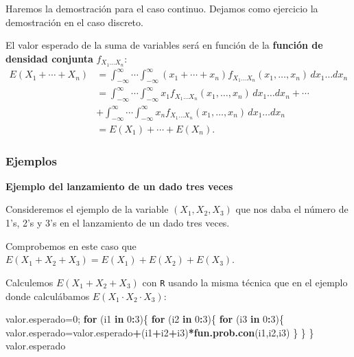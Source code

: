 \documentclass[]{book}
\newenvironment{Shaded}{\begin{snugshade}}{\end{snugshade}}
\newcommand{\ControlFlowTok}[1]{\textcolor[rgb]{0.13,0.29,0.53}{\textbf{#1}}}
\newcommand{\DecValTok}[1]{\textcolor[rgb]{0.00,0.00,0.81}{#1}}
\newcommand{\KeywordTok}[1]{\textcolor[rgb]{0.13,0.29,0.53}{\textbf{#1}}}
\newcommand{\NormalTok}[1]{#1}
\newcommand{\OperatorTok}[1]{\textcolor[rgb]{0.81,0.36,0.00}{\textbf{#1}}}
\begin{document}
Haremos la demostración para el caso continuo. Dejamos como ejercicio la demostración en el caso discreto.

El valor esperado de la suma de variables será en función de la \textbf{función de densidad conjunta} \(f_{X_1\ldots X_n}\):
\[
\begin{array}{rl}
E(X_1+\cdots + X_n) & = \int_{-\infty}^\infty\cdots\int_{-\infty}^\infty (x_1+\cdots + x_n)f_{X_1\ldots X_n}(x_1,\ldots,x_n)\,dx_1\ldots dx_n \\ & = \int_{-\infty}^\infty\cdots\int_{-\infty}^\infty x_1f_{X_1\ldots X_n}(x_1,\ldots,x_n)\,dx_1\ldots dx_n+ \cdots \\ & + \int_{-\infty}^\infty\cdots\int_{-\infty}^\infty x_n f_{X_1\ldots X_n}(x_1,\ldots,x_n)\,dx_1\ldots dx_n \\ & = E(X_1)+\cdots + E(X_n).
\end{array}
\]

\hypertarget{ejemplos-21}{%
\subsubsection{Ejemplos}\label{ejemplos-21}}

\textbf{Ejemplo del lanzamiento de un dado tres veces}

Consideremos el ejemplo de la variable \((X_1,X_2,X_3)\) que nos daba el número de 1's, 2's y 3's en el lanzamiento de un dado tres veces.

Comprobemos en este caso que \(E(X_1+X_2+X_3)=E(X_1)+E(X_2)+E(X_3)\).

Calculemos \(E(X_1+X_2+X_3)\) con \texttt{R} usando la misma técnica que en el ejemplo donde calculábamos \(E(X_1\cdot X_2\cdot X_3)\):

\begin{Shaded}
\begin{Highlighting}[]
\NormalTok{valor.esperado=}\DecValTok{0}\NormalTok{;}
\ControlFlowTok{for}\NormalTok{ (i1 }\ControlFlowTok{in} \DecValTok{0}\OperatorTok{:}\DecValTok{3}\NormalTok{)\{}
  \ControlFlowTok{for}\NormalTok{ (i2 }\ControlFlowTok{in} \DecValTok{0}\OperatorTok{:}\DecValTok{3}\NormalTok{)\{}
    \ControlFlowTok{for}\NormalTok{ (i3 }\ControlFlowTok{in} \DecValTok{0}\OperatorTok{:}\DecValTok{3}\NormalTok{)\{}
\NormalTok{      valor.esperado=valor.esperado}\OperatorTok{+}\NormalTok{(i1}\OperatorTok{+}\NormalTok{i2}\OperatorTok{+}\NormalTok{i3)}\OperatorTok{*}\KeywordTok{fun.prob.con}\NormalTok{(i1,i2,i3)}
\NormalTok{    \}}
\NormalTok{  \}}
\NormalTok{\}}
\NormalTok{valor.esperado}
\end{Highlighting}
\end{Shaded}
\end{document}

